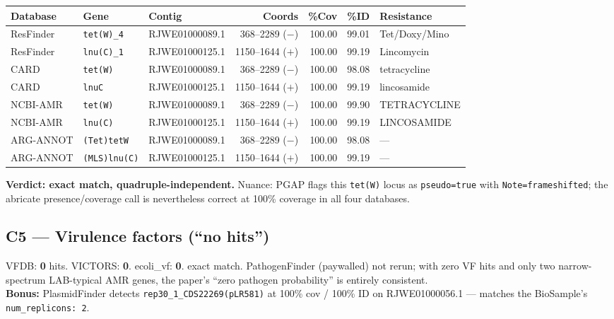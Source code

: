 \documentclass[11pt,letterpaper]{article}
\begin{document}
\begin{longtable}{lllrrrl}
\toprule
Database & Gene & Contig & Coords & \%Cov & \%ID & Resistance \\
\midrule
ResFinder & \texttt{tet(W)\_4} & RJWE01000089.1 & 368--2289 ($-$) & 100.00 & 99.01 & Tet/Doxy/Mino \\
ResFinder & \texttt{lnu(C)\_1} & RJWE01000125.1 & 1150--1644 ($+$) & 100.00 & 99.19 & Lincomycin \\
CARD & \texttt{tet(W)} & RJWE01000089.1 & 368--2289 ($-$) & 100.00 & 98.08 & tetracycline \\
CARD & \texttt{lnuC} & RJWE01000125.1 & 1150--1644 ($+$) & 100.00 & 99.19 & lincosamide \\
NCBI-AMR & \texttt{tet(W)} & RJWE01000089.1 & 368--2289 ($-$) & 100.00 & 99.90 & TETRACYCLINE \\
NCBI-AMR & \texttt{lnu(C)} & RJWE01000125.1 & 1150--1644 ($+$) & 100.00 & 99.19 & LINCOSAMIDE \\
ARG-ANNOT & \texttt{(Tet)tetW} & RJWE01000089.1 & 368--2289 ($-$) & 100.00 & 98.08 & --- \\
ARG-ANNOT & \texttt{(MLS)lnu(C)} & RJWE01000125.1 & 1150--1644 ($+$) & 100.00 & 99.19 & --- \\
\bottomrule
\end{longtable}

\textbf{Verdict: \checkmark exact match, quadruple-independent.} Nuance: PGAP flags this \texttt{tet(W)} locus as \texttt{pseudo=true} with \texttt{Note=frameshifted}; the abricate presence/coverage call is nevertheless correct at 100\% coverage in all four databases.

\subsection*{C5 --- Virulence factors (``no hits'')}
VFDB: \textbf{0} hits. VICTORS: \textbf{0}. ecoli\_vf: \textbf{0}. \checkmark exact match. PathogenFinder (paywalled) not rerun; with zero VF hits and only two narrow-spectrum LAB-typical AMR genes, the paper's ``zero pathogen probability'' is entirely consistent. \\
\textbf{Bonus:} PlasmidFinder detects \texttt{rep30\_1\_CDS22269(pLR581)} at 100\% cov / 100\% ID on RJWE01000056.1 --- matches the BioSample's \texttt{num\_replicons: 2}.
\end{document}
